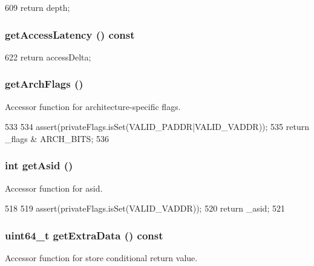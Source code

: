 \begin{DoxyCode}
609 { return depth; }
\end{DoxyCode}
\hypertarget{classRequest_af726194e22b49588e1c087bc810f11cc}{
\subsubsection[{getAccessLatency}]{ getAccessLatency () const}}
\label{classRequest_af726194e22b49588e1c087bc810f11cc}



\begin{DoxyCode}
622 { return accessDelta; }
\end{DoxyCode}
\hypertarget{classRequest_aefd0ec4015a880de7bbf555b15e242b1}{
\subsubsection[{getArchFlags}]{ getArchFlags ()}}
\label{classRequest_aefd0ec4015a880de7bbf555b15e242b1}
Accessor function for architecture-\/specific flags. 


\begin{DoxyCode}
533     {
534         assert(privateFlags.isSet(VALID_PADDR|VALID_VADDR));
535         return _flags & ARCH_BITS;
536     }
\end{DoxyCode}
\hypertarget{classRequest_a7851b2fdca6855f205dba9b17bbeeb09}{
\subsubsection[{getAsid}]{\setlength{\rightskip}{0pt plus 5cm}int getAsid ()}}
\label{classRequest_a7851b2fdca6855f205dba9b17bbeeb09}
Accessor function for asid. 


\begin{DoxyCode}
518     {
519         assert(privateFlags.isSet(VALID_VADDR));
520         return _asid;
521     }
\end{DoxyCode}
\hypertarget{classRequest_af848a06a731668855b203d679077623d}{
\subsubsection[{getExtraData}]{\setlength{\rightskip}{0pt plus 5cm}uint64\_\-t getExtraData () const}}
\label{classRequest_af848a06a731668855b203d679077623d}
Accessor function for store conditional return value. 


